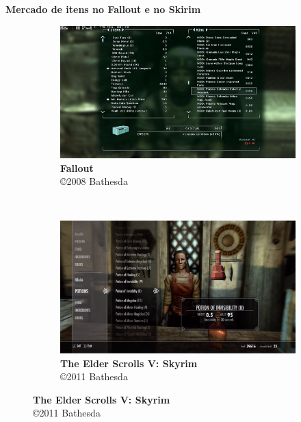 \expandafter\documentclass\expandafter[table, usenames, svgnames, dvipsnames, \classopts]{beamer}
\begin{document}
\begin{frame}{\textbf{Mercado de itens no Fallout e no Skirim}}

	\begin{figure}
	    \centering

	    \begin{subfigure}[!h]{0.4\paperwidth}
	    	\centering
	    	\includegraphics[height=0.32\paperheight]{fallout-screenshot}
	        \caption{\scriptsize\textbf{Fallout}\\\copyright{2008} Bathesda\footnotemark{}}
	    \end{subfigure}
	    ~
		\begin{subfigure}[!h]{0.4\paperwidth}
			\centering
	        \includegraphics[height=0.32\paperheight]{skyrim-screenshot}
	        \caption{\scriptsize\textbf{The Elder Scrolls V: Skyrim}\\\copyright{2011} Bathesda\footnotemark{}}
	    \end{subfigure}
    \end{figure}


\end{frame}
\end{document}
